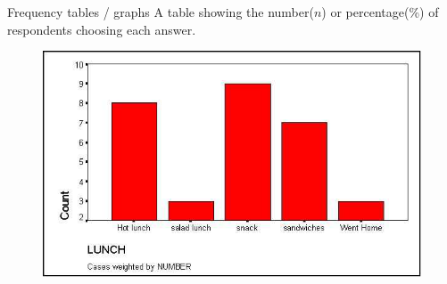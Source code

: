 \documentclass[10pt, compress]{beamer}
\begin{document}
\begin{frame}[t]{Frequency tables / graphs}
    A table showing the number($n$) or percentage(\%) of respondents choosing
    each answer.
    \begin{figure}
        \begin{center}
            \includegraphics[scale=0.4]{img/imageC5J.png}
        \end{center}
    \end{figure}
\end{frame}
\end{document}
